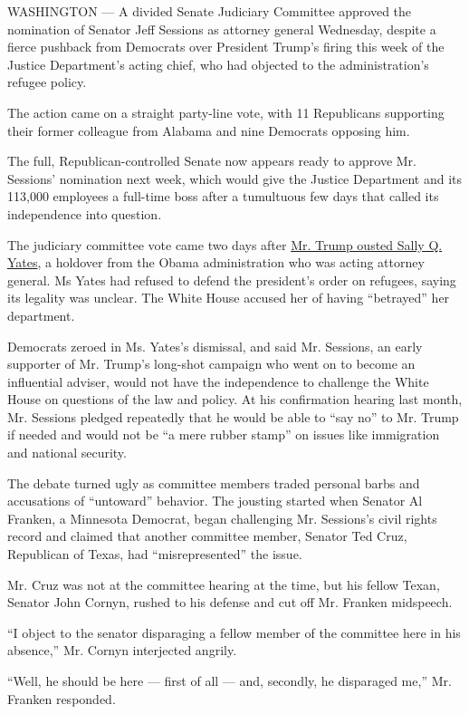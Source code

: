 WASHINGTON --- A divided Senate Judiciary Committee approved the
nomination of Senator Jeff Sessions as attorney general Wednesday,
despite a fierce pushback from Democrats over President Trump's firing
this week of the Justice Department's acting chief, who had objected to
the administration's refugee policy.

The action came on a straight party-line vote, with 11 Republicans
supporting their former colleague from Alabama and nine Democrats
opposing him.

The full, Republican-controlled Senate now appears ready to approve Mr.
Sessions' nomination next week, which would give the Justice Department
and its 113,000 employees a full-time boss after a tumultuous few days
that called its independence into question.

The judiciary committee vote came two days after
\href{https://www.nytimes.com/2017/01/30/us/politics/trump-immigration-ban-memo.html}{Mr.
Trump ousted Sally Q. Yates}, a holdover from the Obama administration
who was acting attorney general. Ms Yates had refused to defend the
president's order on refugees, saying its legality was unclear. The
White House accused her of having ``betrayed'' her department.

Democrats zeroed in Ms. Yates's dismissal, and said Mr. Sessions, an
early supporter of Mr. Trump's long-shot campaign who went on to become
an influential adviser, would not have the independence to challenge the
White House on questions of the law and policy. At his confirmation
hearing last month, Mr. Sessions pledged repeatedly that he would be
able to ``say no'' to Mr. Trump if needed and would not be ``a mere
rubber stamp'' on issues like immigration and national security.

The debate turned ugly as committee members traded personal barbs and
accusations of ``untoward'' behavior. The jousting started when Senator
Al Franken, a Minnesota Democrat, began challenging Mr. Sessions's civil
rights record and claimed that another committee member, Senator Ted
Cruz, Republican of Texas, had ``misrepresented'' the issue.

Mr. Cruz was not at the committee hearing at the time, but his fellow
Texan, Senator John Cornyn, rushed to his defense and cut off Mr.
Franken midspeech.

``I object to the senator disparaging a fellow member of the committee
here in his absence,'' Mr. Cornyn interjected angrily.

``Well, he should be here --- first of all --- and, secondly, he
disparaged me,'' Mr. Franken responded.

